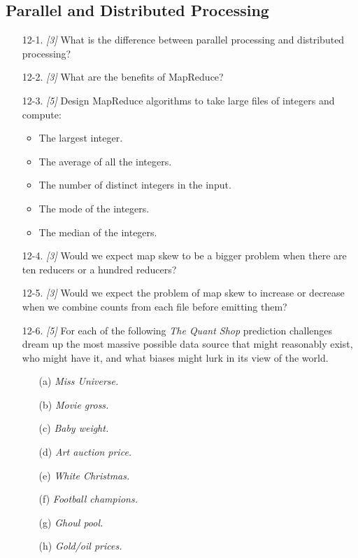 \documentclass[10pt]{article}
\begin{document}
\begin{enumerate}
\section*{Parallel and Distributed Processing}
\begin{enumerate}
  \item[12-1.] \textit{[3]} What is the difference between parallel processing and distributed processing?
  \item[12-2.] \textit{[3]} What are the benefits of MapReduce?
  \item[12-3.] \textit{[5]} Design MapReduce algorithms to take large files of integers and compute:
  \begin{itemize}
    \item The largest integer.
    \item The average of all the integers.
    \item The number of distinct integers in the input.
    \item The mode of the integers.
    \item The median of the integers.
  \end{itemize}
  \item[12-4.] \textit{[3]} Would we expect map skew to be a bigger problem when there are ten reducers or a hundred reducers?
  \item[12-5.] \textit{[3]} Would we expect the problem of map skew to increase or decrease when we combine counts from each file before emitting them?
  \item[12-6.] \textit{[5]} For each of the following \textit{The Quant Shop} prediction challenges dream up the most massive possible data source that might reasonably exist, who might have it, and what biases might lurk in its view of the world.
  \begin{itemize}
    \item[(a)] \textit{Miss Universe.}
    \item[(b)] \textit{Movie gross.}
    \item[(c)] \textit{Baby weight.}
    \item[(d)] \textit{Art auction price.}
    \item[(e)] \textit{White Christmas.}
    \item[(f)] \textit{Football champions.}
    \item[(g)] \textit{Ghoul pool.}
    \item[(h)] \textit{Gold/oil prices.}
  \end{itemize}
\end{enumerate}


\end{enumerate}
\end{document}
